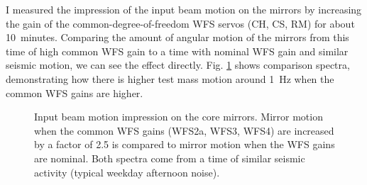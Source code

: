 I measured the impression of the input beam motion on the mirrors by
increasing the gain of the common-degree-of-freedom WFS servos (CH,
CS, RM) for about 10~minutes. Comparing the amount of angular
motion of the mirrors from this time of high common WFS gain to a time
with nominal WFS gain and similar seismic motion, we can see the
effect directly. Fig. \ref{fig:inputbeam_impression} shows comparison
spectra, demonstrating how there is higher test mass motion around
1~Hz when the common WFS gains are higher.

\begin{figure}
\begin{centering}
\caption[Impression of input beam motion on the core mirrors]{Input beam motion impression on the core mirrors. Mirror
  motion when the common WFS gains (WFS2a, WFS3, WFS4) are increased by a
  factor of 2.5 is compared to mirror motion when the WFS gains are
  nominal. Both spectra come from a time of similar seismic activity
  (typical weekday afternoon noise).}
\label{fig:inputbeam_impression}
\end{centering}
\end{figure}

